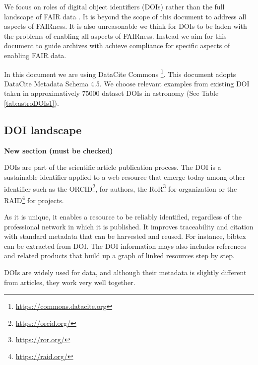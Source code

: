 \documentclass[11pt,a4paper]{ivoa}
\begin{document}
We focus on roles of digital object identifiers (DOIs) rather than the full landscape of FAIR data \citep{Wilkinson2016}. 
It is beyond the scope of this document to address all aspects of FAIRness.
It is also unreasonable we think for DOIs to be laden with the problems of enabling all aspects of FAIRness. 
Instead we aim for this document to guide archives with achieve compliance for specific aspects of enabling FAIR data.


In this document we are using DataCite Commons  \footnote{\url{https://commons.datacite.org}}. This document adopts DataCite Metadata Schema 4.5.
We choose relevant examples from existing DOI taken in approximatively 75000 dataset DOIs in astronomy (See Table \ref{tab:astroDOIs1}). 



\subsection{DOI landscape}
\textbf{\color{red}New section (must be checked)}



DOIs are part of the scientific article publication process. The DOI is a sustainable identifier applied to a web resource that emerge today among other identifier such  as the ORCID\footnote{\url{https://orcid.org/}}, for authors, the RoR\footnote{\url{https://ror.org/}} for organization or the RAID\footnote{\url{https://raid.org/}} for projects.

As it is unique, it enables a resource to be reliably identified, regardless of the professional network in which it is published. It improves traceability and citation with standard metadata that can be harvested and reused. For instance, bibtex can be extracted from DOI. The DOI information mays also includes references and related products that build up a graph of linked resources step by step.

DOIs are widely used for data, and although their metadata is slightly different from articles, they work very well together.
\end{document}
